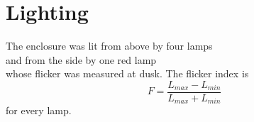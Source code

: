 \documentclass{article}
\begin{document}
\section{Lighting}
The enclosure was lit from above by four lamps\\[2pt]
and from the side by one red lamp\\[4pt]
whose flicker was measured at dusk.
The flicker index is
\[ F = \frac{L_{max} - L_{min}}{L_{max} + L_{min}} \]
for every lamp.
\end{document}
